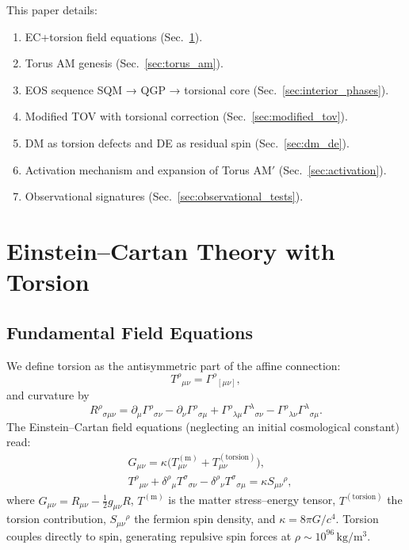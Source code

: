 \documentclass{article}
\begin{document}
This paper details:
\begin{enumerate}
  \item EC+torsion field equations (Sec.~\ref{sec:ec_overview}).
  \item Torus AM genesis (Sec.~\ref{sec:torus_am}).
  \item EOS sequence SQM → QGP → torsional core (Sec.~\ref{sec:interior_phases}).
  \item Modified TOV with torsional correction (Sec.~\ref{sec:modified_tov}).
  \item DM as torsion defects and DE as residual spin (Sec.~\ref{sec:dm_de}).
  \item Activation mechanism and expansion of Torus AM$'$ (Sec.~\ref{sec:activation}).
  \item Observational signatures (Sec.~\ref{sec:observational_tests}).
\end{enumerate}

\section{Einstein–Cartan Theory with Torsion}\label{sec:ec_overview}

\subsection{Fundamental Field Equations}
We define torsion as the antisymmetric part of the affine connection:
\[
  T^\rho{}_{\mu\nu} = \Gamma^\rho{}_{[\mu\nu]},
\]
and curvature by
\[
  R^\rho{}_{\sigma\mu\nu} = \partial_\mu\Gamma^\rho{}_{\sigma\nu} - \partial_\nu\Gamma^\rho{}_{\sigma\mu}
     + \Gamma^\rho{}_{\lambda\mu}\Gamma^\lambda{}_{\sigma\nu} - \Gamma^\rho{}_{\lambda\nu}\Gamma^\lambda{}_{\sigma\mu}.
\]
The Einstein–Cartan field equations (neglecting an initial cosmological constant) read:
\begin{subequations}
\begin{align}
  & G_{\mu\nu} = \kappa\bigl(T_{\mu\nu}^{(\mathrm{m})} + T_{\mu\nu}^{(\mathrm{torsion})}\bigr), \\ 
  & T^\rho{}_{\mu\nu} + \delta^\rho{}_{\mu}T^\sigma{}_{\sigma\nu} - \delta^\rho{}_{\nu}T^\sigma{}_{\sigma\mu} = \kappa S_{\mu\nu}{}^\rho,
\end{align}
\end{subequations}
where $G_{\mu\nu}=R_{\mu\nu}-\tfrac12g_{\mu\nu}R$, $T^{(\mathrm{m})}$ is the matter stress–energy tensor, $T^{(\mathrm{torsion})}$ the torsion contribution, $S_{\mu\nu}{}^\rho$ the fermion spin density, and $\kappa=8\pi G/c^4$.
Torsion couples directly to spin, generating repulsive spin forces at $\rho\sim10^{96}\,\mathrm{kg/m^3}$.
\end{document}
